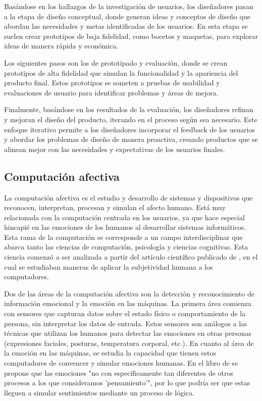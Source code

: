 Basándose en los hallazgos de la investigación de usuarios, los diseñadores pasan a la etapa de diseño conceptual, donde generan ideas y conceptos de diseño que abordan las necesidades y metas identificadas de los usuarios. En esta etapa se suelen crear prototipos de baja fidelidad, como bocetos y maquetas, para explorar ideas de manera rápida y económica.

Los siguientes pasos son los de prototipado y evaluación, donde se crean prototipos de alta fidelidad que simulan la funcionalidad y la apariencia del producto final. Estos prototipos se someten a pruebas de usabilidad y evaluaciones de usuario para identificar problemas y áreas de mejora.

Finalmente, basándose en los resultados de la evaluación, los diseñadores refinan y mejoran el diseño del producto, iterando en el proceso según sea necesario. Este enfoque iterativo permite a los diseñadores incorporar el feedback de los usuarios y abordar los problemas de diseño de manera proactiva, creando productos que se alinean mejor con las necesidades y expectativas de los usuarios finales.

\subsection{Computación afectiva}

La computación afectiva es el estudio y desarrollo de sistemas y dispositivos que reconocen, interpretan, procesan y simulan el afecto humano. Está muy relacionada con la computación centrada en los usuarios, ya que hace especial hincapié en las emociones de los humanos al desarrollar sistemas informáticos. Esta rama de la computación se corresponde a un campo interdisciplinar que abarca tanto las ciencias de computación, psicología y ciencias cognitivas. Esta ciencia comenzó a ser analizada a partir del artículo científico publicado de \cite{picard1995computer}, en el cual se estudiaban maneras de aplicar la subjetividad humana a los computadores.

Dos de las áreas de la computación afectiva son la detección y reconocimiento de información emocional y la emoción en las máquinas. La primera área comienza con sensores que capturan datos sobre el estado físico o comportamiento de la persona, sin interpretar los datos de entrada. Estos sensores son análogos a las técnicas que utilizan los humanos para detectar las emociones en otras personas (expresiones faciales, posturas, temperatura corporal, etc.). En cuanto al área de la emoción en las máquinas, se estudia la capacidad que tienen estos computadores de convencer y simular emociones humanas. En el libro de \cite{minsky2007emotion} se propone que las emociones "no con específicamente tan diferentes de otros procesos a los que consideramos 'pensamiento'", por lo que podría ser que estas lleguen a simular sentimientos mediante un proceso de lógica.


